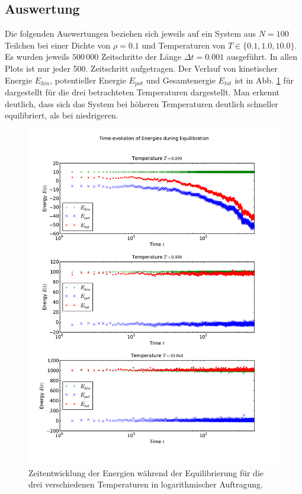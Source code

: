 \documentclass[11pt,a4paper]{article}
\begin{document}
\subsection{Auswertung} %
\label{sub:auswertung}
Die folgenden Auswertungen beziehen sich jeweils auf ein System aus $N=100$ Teilchen bei einer Dichte von $\rho = 0.1$ und Temperaturen von $T \in \{0.1, 1.0, 10.0\}$. Es wurden jeweils $500\,000$ Zeitschritte der Länge $\Delta t = 0.001$ ausgeführt. In allen Plots ist nur jeder 500. Zeitschritt aufgetragen.
Der Verlauf von kinetischer Energie $E_{kin}$, potentieller Energie $E_{pot}$ und Gesamtenergie $E_{tot}$ ist in Abb. \ref{fig:energies} für dargestellt für die drei betrachteten Temperaturen dargestellt. Man erkennt deutlich, dass sich das System bei höheren Temperaturen deutlich schneller equilibriert, als bei niedrigeren.
\begin{figure}[tbp]
\hspace*{-3em}\vspace*{-1.5cm}  \includegraphics[width=17cm]{../energies}
 \caption{Zeitentwicklung der Energien während der Equilibrierung für die drei verschiedenen Temperaturen in logarithmischer Auftragung.}\label{fig:energies}
\end{figure}
\end{document}
